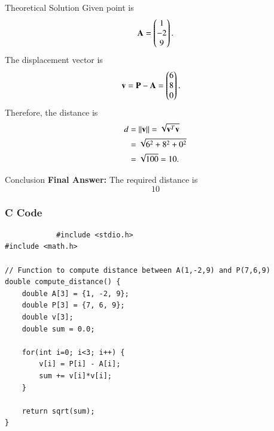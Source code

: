 \documentclass{beamer}
\begin{document}
\begin{frame}{Theoretical Solution}
Given point is
\begin{align}
    \mathbf{A} = \begin{pmatrix}1 \\ -2 \\ 9\end{pmatrix}.
\end{align}
The displacement vector is
\begin{align}
    \mathbf{v} &= \mathbf{P} - \mathbf{A} = \begin{pmatrix}6 \\ 8 \\ 0\end{pmatrix}.
\end{align}
Therefore, the distance is
\begin{align}
    d &= \left\lVert\mathbf{v}\right\rVert = \sqrt{\mathbf{v}^T\mathbf{v}} \\
      &= \sqrt{6^2 + 8^2 + 0^2} \\
      &= \sqrt{100} = 10.
\end{align}
\end{frame}
\begin{frame}{Conclusion}
\textbf{Final Answer: } The required distance is 
\[
\boxed{10}
\]
	\end{frame}
	
	\begin{frame}[fragile]
		\frametitle{C Code }
		
		\begin{lstlisting}
			#include <stdio.h>
#include <math.h>

// Function to compute distance between A(1,-2,9) and P(7,6,9)
double compute_distance() {
    double A[3] = {1, -2, 9};
    double P[3] = {7, 6, 9};
    double v[3];
    double sum = 0.0;

    for(int i=0; i<3; i++) {
        v[i] = P[i] - A[i];
        sum += v[i]*v[i];
    }

    return sqrt(sum);
}
				
			\end{lstlisting}
		\end{frame}
		
\end{document}
